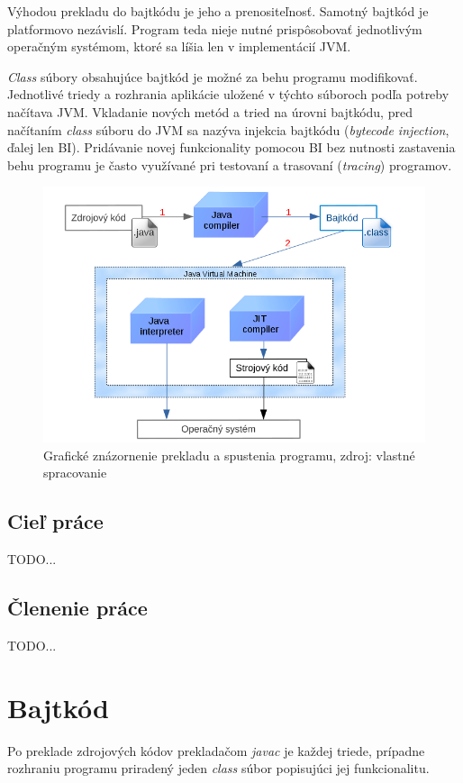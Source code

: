 \documentclass[11pt,final,oneside]{fithesis}
\begin{document}
Výhodou prekladu do bajtkódu je jeho a prenositeľnosť. Samotný bajtkód je
platformovo nezávislí. Program teda nieje nutné prispôsobovať jednotlivým
operačným systémom, ktoré sa líšia len v implementácií JVM.

\textit{Class} súbory obsahujúce bajtkód je možné za behu programu modifikovať.
Jednotlivé triedy a rozhrania aplikácie uložené v týchto súboroch podľa potreby
načítava JVM. Vkladanie nových metód a tried na úrovni bajtkódu, pred
načítaním \textit{class} súboru do JVM sa nazýva injekcia bajtkódu
(\textit{bytecode injection}, ďalej len BI). Pridávanie novej funkcionality
pomocou BI bez nutnosti zastavenia behu programu je často využívané pri
testovaní a trasovaní (\textit{tracing}) programov.

\begin{figure}[h]
  \centering
   \includegraphics[width=\textwidth]{JVM.png}
  \caption{Grafické znázornenie prekladu a spustenia programu, zdroj: vlastné
  spracovanie}
  \label{fig:jvm}
\end{figure}

\section{Cieľ práce}
TODO...

\section{Členenie práce}
TODO...

\chapter{Bajtkód}
Po preklade zdrojových kódov prekladačom \textit{javac} je každej
triede, prípadne rozhraniu programu priradený jeden \textit{class} súbor
popisujúci jej funkcionalitu.
\end{document}
